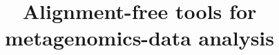 \documentclass[twocolumn]{bmcart}%
\begin{document}
\begin{frontmatter}

\begin{fmbox}


\title{Alignment-free tools for metagenomics-data analysis}


\author[
   addressref={aff1},                   %
   corref={aff1},                       %
   email={robert.deibel@student.uni-tuebingen.de}   %
]{ }


\address[id=aff1]{%
  , %
  ,                              %
}




\end{fmbox}
\end{frontmatter}
\end{document}
